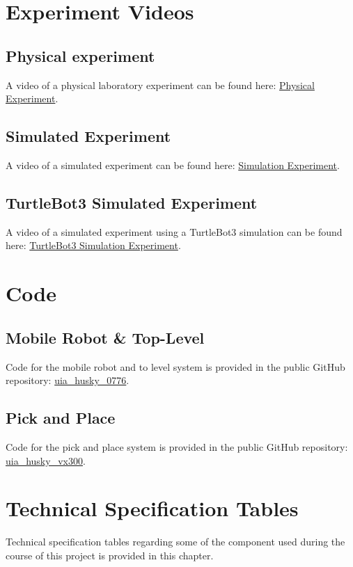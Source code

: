 \appendix

\chapter{Experiment Videos} \label{A:ExperimentVideos}
\section{Physical experiment}
A video of a physical laboratory experiment can be found here: \href{https://youtu.be/hxrZh7bj16A}{Physical Experiment}.

\section{Simulated Experiment}
A video of a simulated experiment can be found here: \href{https://youtu.be/po9pRVNtn78}{Simulation Experiment}.

\section{TurtleBot3 Simulated Experiment}
A video of a simulated experiment using a TurtleBot3 simulation can be found here: \href{https://youtu.be/_Dy3rSTHWYo}{TurtleBot3 Simulation Experiment}.

\chapter{Code} \label{A:Code}
\section{Mobile Robot \& Top-Level} \label{A:Code:uiaHusky0776}
Code for the mobile robot and to level system is provided in the public GitHub repository: \href{https://github.com/orjano-max/uia_husky_0776}{uia\_husky\_0776}.

\section{Pick and Place}\label{A:Code:uiaHuskyVx300}
Code for the pick and place system is provided in the public GitHub repository: \\\href{https://github.com/orjano-max/uia_husky_vx300}{uia\_husky\_vx300}.


\chapter{Technical Specification Tables}
Technical specification tables regarding some of the component used during the course of this project is provided in this chapter.
